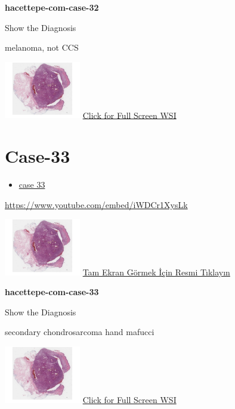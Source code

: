 \documentclass[
  letterpaper,
  paper=6in:9in,
  pagesize=pdftex,
  headinclude=on,
  footinclude=on,
  12pt]{scrbook}
\providecommand{\tightlist}{%
  \setlength{\itemsep}{0pt}\setlength{\parskip}{0pt}}\usepackage{longtable,booktabs,array}
\begin{document}
\textbf{hacettepe-com-case-32}

Show the Diagnosis

\hypertarget{answer32}{}
melanoma, not CCS

\href{https://images.patolojiatlasi.com/hacettepe-com-case-1/HE.html}{\includegraphics[width=0.25\textwidth,height=\textheight]{./screenshots/hacettepe-com-case-1_screenshot.png}}
\href{https://images.patolojiatlasi.com/hacettepe-com-case-32/HE.html}{Click
for Full Screen WSI}

\hypertarget{sec-hacettepe-case-of-the-month-case-33}{%
\section{Case-33}\label{sec-hacettepe-case-of-the-month-case-33}}

\begin{itemize}
\tightlist
\item
  \href{https://www.youtube.com/watch?v=iWDCr1XysLk\&ab_channel=KemalKosemehmetoglu}{case
  33}
\end{itemize}

\url{https://www.youtube.com/embed/iWDCr1XysLk}

\href{https://images.patolojiatlasi.com/hacettepe-com-case-1/HE.html}{\includegraphics[width=0.25\textwidth,height=\textheight]{./screenshots/hacettepe-com-case-1_screenshot.png}}
\href{https://images.patolojiatlasi.com/hacettepe-com-case-33/HE.html}{Tam
Ekran Görmek İçin Resmi Tıklayın}

\textbf{hacettepe-com-case-33}

Show the Diagnosis

\hypertarget{answer33}{}
secondary chondrosarcoma hand mafucci

\href{https://images.patolojiatlasi.com/hacettepe-com-case-1/HE.html}{\includegraphics[width=0.25\textwidth,height=\textheight]{./screenshots/hacettepe-com-case-1_screenshot.png}}
\href{https://images.patolojiatlasi.com/hacettepe-com-case-33/HE.html}{Click
for Full Screen WSI}
\end{document}
